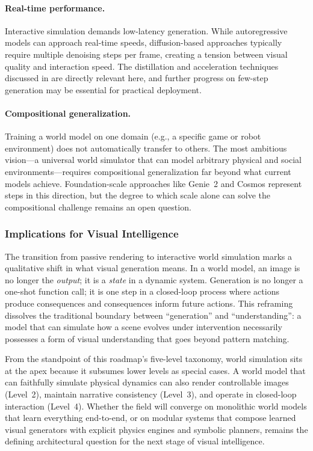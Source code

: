\paragraph{Real-time performance.} Interactive simulation demands low-latency generation. While autoregressive models can approach real-time speeds, diffusion-based approaches typically require multiple denoising steps per frame, creating a tension between visual quality and interaction speed. The distillation and acceleration techniques discussed in  are directly relevant here, and further progress on few-step generation may be essential for practical deployment.

\paragraph{Compositional generalization.} Training a world model on one domain (e.g., a specific game or robot environment) does not automatically transfer to others. The most ambitious vision---a universal world simulator that can model arbitrary physical and social environments---requires compositional generalization far beyond what current models achieve. Foundation-scale approaches like Genie~2 and Cosmos represent steps in this direction, but the degree to which scale alone can solve the compositional challenge remains an open question.

\subsubsection{Implications for Visual Intelligence}

The transition from passive rendering to interactive world simulation marks a qualitative shift in what visual generation means. In a world model, an image is no longer the \emph{output}; it is a \emph{state} in a dynamic system. Generation is no longer a one-shot function call; it is one step in a closed-loop process where actions produce consequences and consequences inform future actions. This reframing dissolves the traditional boundary between ``generation'' and ``understanding'': a model that can simulate how a scene evolves under intervention necessarily possesses a form of visual understanding that goes beyond pattern matching.

From the standpoint of this roadmap's five-level taxonomy, world simulation sits at the apex because it subsumes lower levels as special cases. A world model that can faithfully simulate physical dynamics can also render controllable images (Level~2), maintain narrative consistency (Level~3), and operate in closed-loop interaction (Level~4). Whether the field will converge on monolithic world models that learn everything end-to-end, or on modular systems that compose learned visual generators with explicit physics engines and symbolic planners, remains the defining architectural question for the next stage of visual intelligence.



